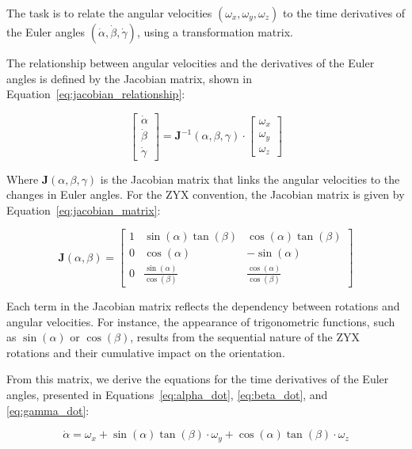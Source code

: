 \documentclass[12pt]{article}
\begin{document}
The task is to relate the angular velocities \((\omega_x, \omega_y, \omega_z)\) to the time derivatives of the Euler angles \((\dot{\alpha}, \dot{\beta}, \dot{\gamma})\), using a transformation matrix.

The relationship between angular velocities and the derivatives of the Euler angles is defined by the Jacobian matrix, shown in Equation~\eqref{eq:jacobian_relationship}:

\begin{equation}
\label{eq:jacobian_relationship}
\begin{bmatrix}
\dot{\alpha} \\
\dot{\beta} \\
\dot{\gamma}
\end{bmatrix} = 
\mathbf{J}^{-1}(\alpha, \beta, \gamma) \cdot 
\begin{bmatrix}
\omega_x \\
\omega_y \\
\omega_z
\end{bmatrix}
\end{equation}

Where \( \mathbf{J}(\alpha, \beta, \gamma) \) is the Jacobian matrix that links the angular velocities to the changes in Euler angles. For the ZYX convention, the Jacobian matrix is given by Equation~\eqref{eq:jacobian_matrix}:

\begin{equation}
\label{eq:jacobian_matrix}
\mathbf{J}(\alpha, \beta) =
\begin{bmatrix}
1 & \sin(\alpha) \tan(\beta) & \cos(\alpha) \tan(\beta) \\
0 & \cos(\alpha) & -\sin(\alpha) \\
0 & \frac{\sin(\alpha)}{\cos(\beta)} & \frac{\cos(\alpha)}{\cos(\beta)}
\end{bmatrix}
\end{equation}

Each term in the Jacobian matrix reflects the dependency between rotations and angular velocities. For instance, the appearance of trigonometric functions, such as \(\sin(\alpha)\) or \(\cos(\beta)\), results from the sequential nature of the ZYX rotations and their cumulative impact on the orientation.

From this matrix, we derive the equations for the time derivatives of the Euler angles, presented in Equations~\eqref{eq:alpha_dot}, \eqref{eq:beta_dot}, and \eqref{eq:gamma_dot}:

\begin{equation}
\label{eq:alpha_dot}
\dot{\alpha} = \omega_x + \sin(\alpha) \tan(\beta) \cdot \omega_y + \cos(\alpha) \tan(\beta) \cdot \omega_z
\end{equation}
\end{document}
